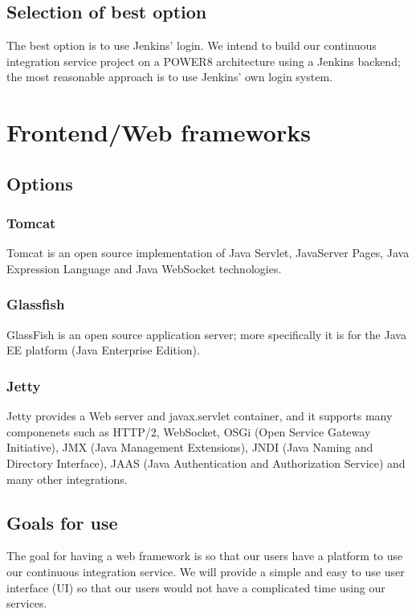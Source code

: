 \documentclass[10pt,letterpaper,onecolumn,journal]{IEEEtran}
\begin{document}
\subsection{Selection of best option}
The best option is to use Jenkins’ login.
We intend to build our continuous integration service project on a POWER8 architecture using a Jenkins backend; the most reasonable approach is to use Jenkins’ own login system.

\section{Frontend/Web frameworks}
\subsection{Options}
\subsubsection{Tomcat}
Tomcat is an open source implementation of Java Servlet, JavaServer Pages, Java Expression Language and Java WebSocket technologies. 
\subsubsection{Glassfish}
GlassFish is an open source application server; more specifically it is for the Java EE platform (Java Enterprise Edition).
\subsubsection{Jetty}
Jetty provides a Web server and javax.servlet container, and it supports many componenets such as HTTP/2, WebSocket, OSGi (Open Service Gateway Initiative), JMX (Java Management Extensions), JNDI (Java Naming and Directory Interface), JAAS (Java Authentication and Authorization Service) and many other integrations.
\subsection{Goals for use}
The goal for having a web framework is so that our users have a platform to use our continuous integration service.
We will provide a simple and easy to use user interface (UI) so that our users would not have a complicated time using our services.
\end{document}
